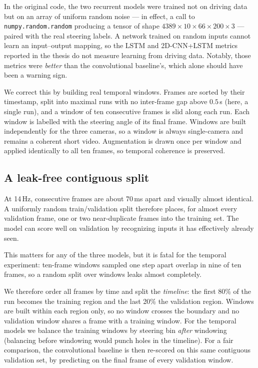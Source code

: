 \documentclass[11pt]{article}
\begin{document}
In the original code, the two recurrent models were trained not on driving data but
on an array of uniform random noise --- in effect, a call to
\texttt{numpy.random.random} producing a tensor of shape
$4389 \times 10 \times 66 \times 200 \times 3$ --- paired with the real
steering labels. A network trained on random inputs cannot learn an input--output
mapping, so the LSTM and 2D-CNN+LSTM metrics reported in the thesis do not measure
learning from driving data. Notably, those metrics were \emph{better} than the
convolutional baseline's, which alone should have been a warning sign.

We correct this by building real temporal windows. Frames are sorted by their
timestamp, split into maximal runs with no inter-frame gap above $0.5$\,s (here, a
single run), and a window of ten consecutive frames is slid along each run. Each
window is labelled with the steering angle of its final frame. Windows are built
independently for the three cameras, so a window is always single-camera and remains
a coherent short video. Augmentation is drawn once per window and applied identically
to all ten frames, so temporal coherence is preserved.

\subsection{A leak-free contiguous split}
\label{sec:leakage}

At 14\,Hz, consecutive frames are about 70\,ms apart and visually almost identical.
A uniformly random train/validation split therefore places, for almost every
validation frame, one or two near-duplicate frames into the training set. The model
can score well on validation by recognizing inputs it has effectively already seen.

This matters for any of the three models, but it is fatal for the temporal
experiment: ten-frame windows sampled one step apart overlap in nine of ten frames,
so a random split over windows leaks almost completely.

We therefore order all frames by time and split the \emph{timeline}: the first 80\%
of the run becomes the training region and the last 20\% the validation region.
Windows are built within each region only, so no window crosses the boundary and no
validation window shares a frame with a training window. For the temporal models we
balance the training windows by steering bin \emph{after} windowing (balancing
before windowing would punch holes in the timeline). For a fair comparison, the
convolutional baseline is then re-scored on this same contiguous validation set, by
predicting on the final frame of every validation window.
\end{document}
